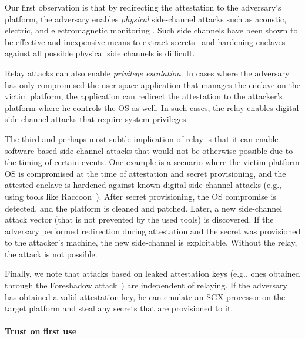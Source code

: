
Our first observation is that by redirecting the attestation to the adversary's platform, the adversary enables \emph{physical} side-channel attacks such as acoustic, electric, and electromagnetic monitoring . Such side channels have been shown to be effective and inexpensive means to extract secrets~\cite{genkin2016physical} and hardening enclaves against all possible physical side channels is difficult. 

Relay attacks can also enable \emph{privilege escalation}. In cases where the adversary has only compromised the user-space application that manages the enclave on the victim platform, the application can redirect the attestation to the attacker's platform where he controls the OS as well. In such cases, the relay enables digital side-channel attacks that require system privileges.

The third and perhaps most subtle implication of relay is that it can enable software-based side-channel attacks that would not be otherwise possible due to the timing of certain events. One example is a scenario where the victim platform OS is compromised at the time of attestation and secret provisioning, and the attested enclave is hardened against known digital side-channel attacks (e.g., using tools like Raccoon~\cite{raccoon}). After secret provisioning, the OS compromise is detected, and the platform is cleaned and patched. Later, a new side-channel attack vector (that is not prevented by the used tools) is discovered. If the adversary performed redirection during attestation and the secret was provisioned to the attacker's machine, the new side-channel is exploitable. Without the relay, the attack is not possible. 

Finally, we note that attacks based on leaked attestation keys (e.g., ones obtained through the Foreshadow attack~\cite{van2018foreshadow}) are independent of relaying. If the adversary has obtained a valid attestation key, he can emulate an SGX processor on the target platform and steal any secrets that are provisioned to it.


\paragraph{Trust on first use}

